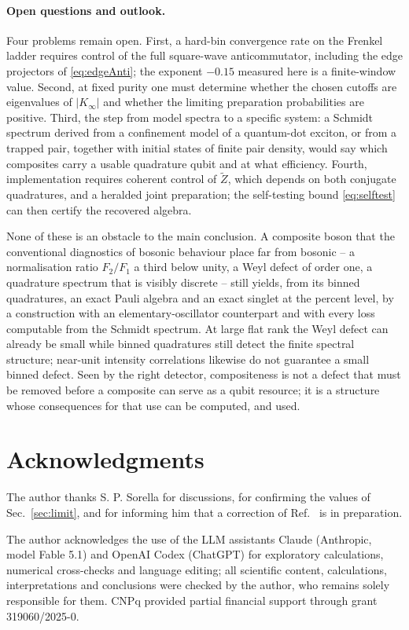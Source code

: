 \documentclass[11pt,a4paper]{article}
\newcommand{\Zt}{\widetilde Z}
\begin{document}
\paragraph{Open questions and outlook.}
Four problems remain open. First, a hard-bin convergence rate on the Frenkel ladder requires control of the full square-wave anticommutator, including the edge projectors of \eqref{eq:edgeAnti}; the exponent $-0.15$ measured here is a finite-window value. Second, at fixed purity one must determine whether the chosen cutoffs are eigenvalues of $|K_\infty|$ and whether the limiting preparation probabilities are positive. Third, the step from model spectra to a specific system: a Schmidt spectrum derived from a confinement model of a quantum-dot exciton, or from a trapped pair, together with initial states of finite pair density, would say which composites carry a usable quadrature qubit and at what efficiency. Fourth, implementation requires coherent control of $\Zt$, which depends on both conjugate quadratures, and a heralded joint preparation; the self-testing bound \eqref{eq:selftest} can then certify the recovered algebra.

None of these is an obstacle to the main conclusion. A composite boson that the conventional diagnostics of bosonic behaviour place far from bosonic -- a normalisation ratio $F_2/F_1$ a third below unity, a Weyl defect of order one, a quadrature spectrum that is visibly discrete -- still yields, from its binned quadratures, an exact Pauli algebra and an exact singlet at the percent level, by a construction with an elementary-oscillator counterpart and with every loss computable from the Schmidt spectrum. At large flat rank the Weyl defect can already be small while binned quadratures still detect the finite spectral structure; near-unit intensity correlations likewise do not guarantee a small binned defect. Seen by the right detector, compositeness is not a defect that must be removed before a composite can serve as a qubit resource; it is a structure whose consequences for that use can be computed, and used.

\section*{Acknowledgments}
The author thanks S. P. Sorella for discussions, for confirming the values of Sec.~\ref{sec:limit}, and for informing him that a correction of Ref.~\cite{Sorella2026} is in preparation.

The author acknowledges the use of the LLM assistants Claude (Anthropic, model Fable 5.1) and OpenAI Codex (ChatGPT) for exploratory calculations, numerical cross-checks and language editing; all scientific content, calculations, interpretations and conclusions were checked by the author, who remains solely responsible for them. CNPq provided partial financial support through grant \mbox{319060/2025-0}.
\end{document}
